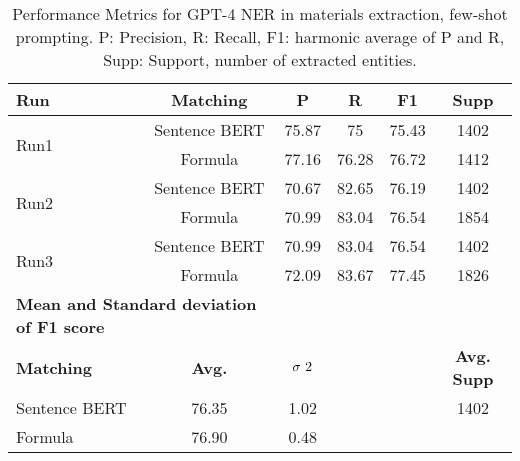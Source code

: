 \begin{table}[htbp]
\small
  \centering
  \caption{Performance Metrics for GPT-4 NER in materials extraction, few-shot prompting. P: Precision, R: Recall, F1: harmonic average of P and R, Supp: Support, number of extracted entities.}
  \begin{tabular}{lccccc}
    \toprule
    \textbf{Run} & \textbf{Matching} & \textbf{P} & \textbf{R} & \textbf{F1} & \textbf{Supp} \\
    \midrule
    \multirow{2}{*}{Run1} & Sentence BERT & 75.87 & 75 & 75.43 & 1402 \\
    & Formula & 77.16 & 76.28 & 76.72 & 1412 \\
    \midrule
    \multirow{2}{*}{Run2} & Sentence BERT & 70.67 & 82.65 & 76.19 & 1402 \\
    & Formula & 70.99 & 83.04 & 76.54 & 1854 \\
    \midrule
    \multirow{2}{*}{Run3} & Sentence BERT & 70.99 & 83.04 & 76.54 & 1402 \\
    & Formula & 72.09 & 83.67 & 77.45 & 1826 \\
    \midrule
    \multicolumn{2}{l}{\textbf{Mean and Standard deviation of F1 score}} & & & & \\
    \midrule
    \textbf{Matching} & \textbf{Avg.} & $\sigma\textsuperscript{2}$ & & & \textbf{Avg. Supp}\\
    Sentence BERT & 76.35 & 1.02 & & & 1402 \\
    Formula & 76.90 & 0.48 & & & \\
    \bottomrule
  \end{tabular}
\end{table}



